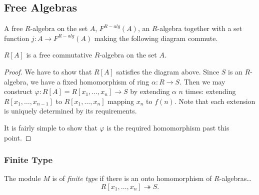 \subsection{Free Algebras}\label{freealgebras}
A free $R$-algebra on the set $A$, $F^{R-alg}(A)$, an $R$-algebra together with a set
function $j : A \rightarrow F^{R-alg}(A)$ making the following diagram commute.
\begin{figure}[H]
\centering 

\end{figure}

\begin{proposition}
$R[A]$ is a free commutative $R$-algebra on the set $A$.
\end{proposition}

\begin{proof}
We have to show that $R[A]$ satisfies the diagram above. Since $S$ is an $R$-algebra, we have a fixed homomorphism
of ring $\alpha : R \rightarrow S$. Then we may construct $\varphi : R[A] = R[x_1,\dots,x_n] \rightarrow S$ by extending
$\alpha$ $n$ times: extending $R[x_1,\dots,x_{n-1}]$ to $R[x_1,\dots,x_n]$ mapping $x_n$ to $f(n)$. Note that each extension
is uniquely determined by its requirements.

It is fairly simple to show that $\varphi$ is the required homomorphism past this point.
\end{proof}

\subsubsection{Finite Type}\label{finitetype}
The module $M$ is of \emph{finite type} if there is an onto homomorphism of $R$-algebras\dots
$$R[x_1,\dots,x_n] \twoheadrightarrow S.$$

